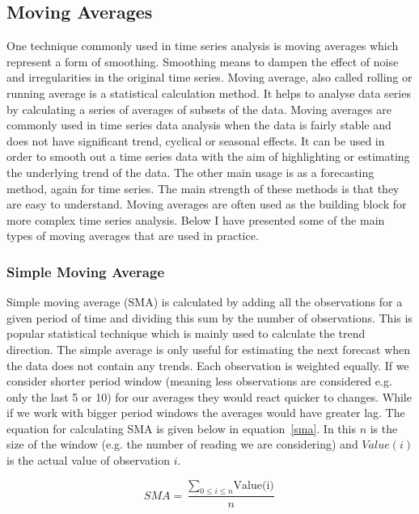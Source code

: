 \subsection{Moving Averages}
One technique commonly used in time series analysis is moving averages which represent a form of smoothing. Smoothing means to dampen the effect of noise and irregularities in the original time series. Moving average, also called rolling or running average is a statistical calculation method. It helps to analyse data series by calculating a series of averages of subsets of the data. Moving averages are commonly used in time series data analysis when the data is fairly stable and does not have significant trend, cyclical or seasonal effects. It can be used in order to smooth out a time series data with the aim of highlighting or estimating the underlying trend of the data. The other main usage is as a forecasting method, again for time series. The main strength of these methods is that they are easy to understand. Moving averages are often used as the building block for more complex time series analysis. Below I have presented some of the main types of moving averages that are used in practice. \cite{brockwell2009time,shumway2010time}

\subsubsection{Simple Moving Average}
Simple moving average (SMA) is calculated by adding all the observations for a given period of time and dividing this sum by the number of observations. This is popular statistical technique which is mainly used to calculate the trend direction. The simple average is only useful for estimating the next forecast when the data does not contain any trends. Each observation is weighted equally. If we consider shorter period window (meaning less observations are considered e.g. only the last 5 or 10) for our averages they would react quicker to changes. While if we work with bigger period windows the averages would have greater lag. The equation for calculating SMA is given below in equation~\ref{sma}. In this $n$ is the size of the window (e.g. the number of reading we are considering) and $Value(i)$ is the actual value of observation $i$. 

\begin{equation}\label{sma}
	SMA = \frac{\sum_{0\le i\le n}\textrm{Value(i)}}{n}
\end{equation}


